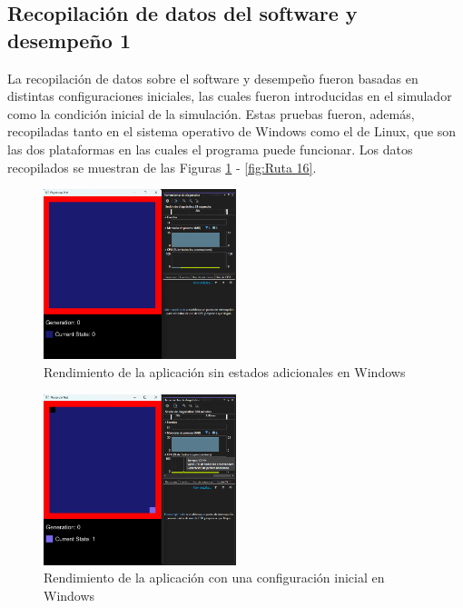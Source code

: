 \subsection{Recopilaci\'on de datos del software y desempe\~no 1}
    La recopilaci\'on de datos sobre el software y desempe\~no
        fueron basadas en distintas configuraciones iniciales, las
        cuales fueron introducidas en el simulador como la
        condici\'on inicial de la simulaci\'on. Estas pruebas fueron,
        adem\'as, recopiladas tanto en el sistema operativo de
        Windows como el de Linux, que son las dos plataformas en
        las cuales el programa puede funcionar. Los datos
        recopilados se muestran de las Figuras \ref{fig:Ruta 6} - \ref{fig:Ruta 16}.
    \vskip 0.5cm
    \begin{figure}[htbp]
        \centering
        \includegraphics[width=0.5\textwidth]{./images/Pruebas/simulador/image019.png}
        \caption{Rendimiento de la aplicaci\'on sin estados adicionales en Windows}
        \label{fig:Ruta 6}
    \end{figure}
    \vskip 0.5cm
    \begin{figure}[htbp]
        \centering
        \includegraphics[width=0.5\textwidth]{./images/Pruebas/simulador/image021.png}
        \caption{Rendimiento de la aplicaci\'on con una configuraci\'on inicial en Windows}
        \label{fig:Ruta 7}
    \end{figure}
